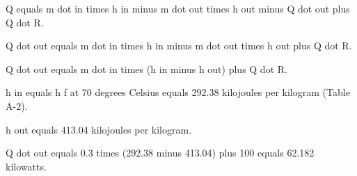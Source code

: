 Q equals m dot in times h in minus m dot out times h out minus Q dot out plus Q dot R.  

Q dot out equals m dot in times h in minus m dot out times h out plus Q dot R.  

Q dot out equals m dot in times (h in minus h out) plus Q dot R.  

h in equals h f at 70 degrees Celsius equals 292.38 kilojoules per kilogram (Table A-2).  

h out equals 413.04 kilojoules per kilogram.  

Q dot out equals 0.3 times (292.38 minus 413.04) plus 100 equals 62.182 kilowatts.